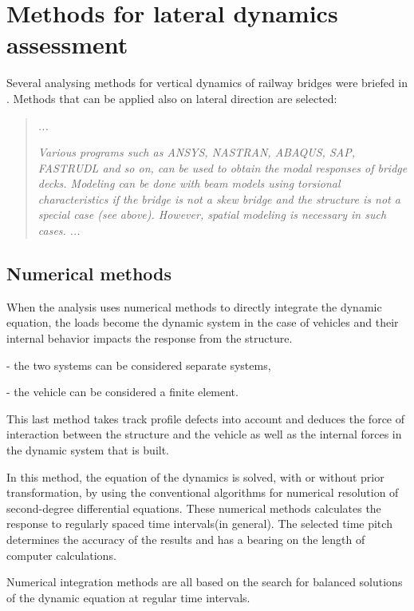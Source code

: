 
\chapter{Methods for lateral dynamics assessment}

Several analysing methods for vertical dynamics of railway bridges were briefed in \citet[A6.2]{UIC776-2}. Methods that can be applied also on lateral direction are selected:

\begin{quote}

\emph{...}

\emph{Various programs such as ANSYS, NASTRAN, ABAQUS, SAP, FASTRUDL and so on, can be used to obtain the modal responses of bridge decks. Modeling can be done with beam models using torsional characteristics if the bridge is not a skew bridge and the structure is not a special case (see above). However, spatial modeling is necessary in such cases.}
\emph{...}

\end{quote}


\section{Numerical methods}

When the analysis uses numerical methods to directly integrate the dynamic equation, the loads become the dynamic system in the case of vehicles and their internal behavior impacts the response from the structure.

- the two systems can be considered separate systems,

- the vehicle can be considered a finite element.

This last method takes track profile defects into account and deduces the force of interaction between the structure and the vehicle as well as the internal forces in the dynamic system that is built.

In this method, the equation of the dynamics is solved, with or without prior transformation, by using the conventional algorithms for numerical resolution of second-degree differential equations. These numerical methods calculates the response to regularly spaced time intervals(in general). The selected time pitch determines the accuracy of the results and has a bearing on the length of computer calculations.

Numerical integration methods are all based on the search for balanced solutions of the dynamic equation at regular time intervals.

